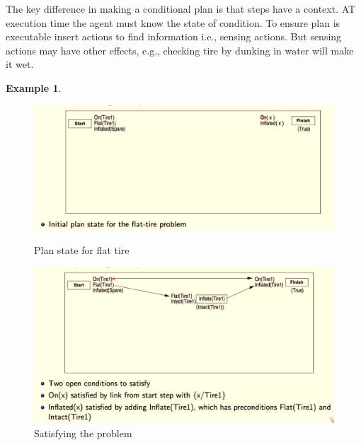 \documentclass[a4paper]{article}
\theoremstyle{plain}
\theoremstyle{definition}
\newtheorem{exmp}{Example}[section]
\theoremstyle{remark}
\begin{document}
The key difference in making a conditional plan is that steps have a context. AT execution time the agent must know the state of condition. To ensure plan is executable insert actions to find information i.e., sensing actions. But sensing actions may have other effects, e.g., checking tire by dunking in water will make it wet.
\begin{exmp}
\end{exmp}
\begin{figure}[H]
   \begin{minipage}{0.48\textwidth}
     \centering
     \includegraphics[width=1\linewidth]{plan/1.png}
     \caption{Plan state for flat tire}\label{Fig:4Data1}
   \end{minipage}\hfill
   \begin{minipage}{0.48\textwidth}
     \centering
     \includegraphics[width=1\linewidth]{plan/2.png}
     \caption{Satisfying the problem}\label{Fig:Data2}
   \end{minipage}
\end{figure}
\end{document}

